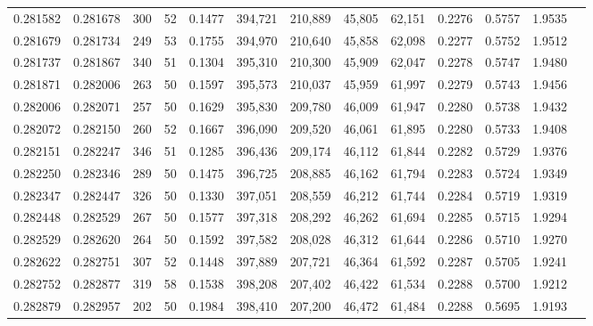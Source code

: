 \begin{tabular}{rrrrrrrrrrrrr}
0.281582 & 0.281678 &   300 &  52 &                                     0.1477 & 394,721 & 210,889 &  45,805 &  62,151 & 0.2276 & 0.5757 & 1.9535 \\
0.281679 & 0.281734 &   249 &  53 &                                     0.1755 & 394,970 & 210,640 &  45,858 &  62,098 & 0.2277 & 0.5752 & 1.9512 \\
0.281737 & 0.281867 &   340 &  51 &                                     0.1304 & 395,310 & 210,300 &  45,909 &  62,047 & 0.2278 & 0.5747 & 1.9480 \\
0.281871 & 0.282006 &   263 &  50 &                                     0.1597 & 395,573 & 210,037 &  45,959 &  61,997 & 0.2279 & 0.5743 & 1.9456 \\
0.282006 & 0.282071 &   257 &  50 &                                     0.1629 & 395,830 & 209,780 &  46,009 &  61,947 & 0.2280 & 0.5738 & 1.9432 \\
0.282072 & 0.282150 &   260 &  52 &                                     0.1667 & 396,090 & 209,520 &  46,061 &  61,895 & 0.2280 & 0.5733 & 1.9408 \\
0.282151 & 0.282247 &   346 &  51 &                                     0.1285 & 396,436 & 209,174 &  46,112 &  61,844 & 0.2282 & 0.5729 & 1.9376 \\
0.282250 & 0.282346 &   289 &  50 &                                     0.1475 & 396,725 & 208,885 &  46,162 &  61,794 & 0.2283 & 0.5724 & 1.9349 \\
0.282347 & 0.282447 &   326 &  50 &                                     0.1330 & 397,051 & 208,559 &  46,212 &  61,744 & 0.2284 & 0.5719 & 1.9319 \\
0.282448 & 0.282529 &   267 &  50 &                                     0.1577 & 397,318 & 208,292 &  46,262 &  61,694 & 0.2285 & 0.5715 & 1.9294 \\
0.282529 & 0.282620 &   264 &  50 &                                     0.1592 & 397,582 & 208,028 &  46,312 &  61,644 & 0.2286 & 0.5710 & 1.9270 \\
0.282622 & 0.282751 &   307 &  52 &                                     0.1448 & 397,889 & 207,721 &  46,364 &  61,592 & 0.2287 & 0.5705 & 1.9241 \\
0.282752 & 0.282877 &   319 &  58 &                                     0.1538 & 398,208 & 207,402 &  46,422 &  61,534 & 0.2288 & 0.5700 & 1.9212 \\
0.282879 & 0.282957 &   202 &  50 &                                     0.1984 & 398,410 & 207,200 &  46,472 &  61,484 & 0.2288 & 0.5695 & 1.9193 \\

\end{tabular}
